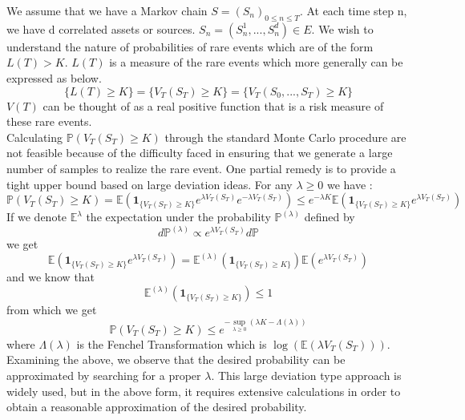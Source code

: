 We assume that we have a Markov chain $S=(S_n)_{0 \leq n \leq T}$. At each time step n, we have d correlated assets or sources. $S_n = (S_n^1,...,S_n^d) \in \mathit{E}$. We wish to understand the nature of probabilities of rare events which are of the form $L(T) > K$. $L(T)$ is a measure of the rare events which more generally can be expressed as below.
$$
\{L(T) \geq K\} = \{V_T(S_T)\geq K\} = \{V_T(S_0,...,S_T)\geq K\}
$$
$V(T)$ can be thought of as a real positive function that is a risk measure of these rare events.\\
Calculating $\mathbb{P}(V_T(S_T) \geq K)$ through the standard Monte Carlo procedure are not feasible because of the difficulty faced in ensuring that we generate a large number of samples to realize the rare event. One partial remedy is to provide a tight upper bound based on large deviation ideas. For any $\lambda \geq 0$ we have :
\begin{equation}
	\mathbb{P}(V_T(S_T)\geq K) = \mathbb{E}\left( \mathbf{1}_{\{V_T(S_T)\geq K\}} e^{\lambda V_T(S_T)} e^{-\lambda V_T(S_T)} \right) \leq
	e^{-\lambda K}\mathbb{E}\left( \mathbf{1}_{\{V_T(S_T)\geq K\}}e^{\lambda V_T(S_T)} \right)
\end{equation}
If we denote $\mathbb{E^{\lambda}}$ the expectation under the probability $\mathbb{P}^{(\lambda)}$ defined by
$$d\mathbb{P}^{(\lambda)} \propto e^{\lambda V_T(S_T)}d\mathbb{P}$$
we get 
$$\mathbb{E}\left( \mathbf{1}_{\{V_T(S_T)\geq K\}}e^{\lambda V_T(S_T)}  \right) = \mathbb{E}^{(\lambda)}\left(\mathbf{1}_{\{V_T(S_T)\geq K\}}\right)\mathbb{E}\left(e^{\lambda V_T(S_T)}\right)$$
and we know that
$$\mathbb{E}^{(\lambda)}\left(\mathbf{1}_{\{V_T(S_T)\geq K\}}\right)\leq 1 $$
from which we get
\begin{equation}
	\mathbb{P}\left(V_T(S_T) \geq K\right) \leq e^{-\sup_{\lambda\geq 0}(\lambda K - \Lambda(\lambda))}
\end{equation}
where $\Lambda(\lambda)$ is the Fenchel Transformation which is $\log (\mathbb{E}(\lambda V_T(S_T)))$.\\
Examining the above, we observe that the desired probability can be approximated by searching for a proper $\lambda$. This large deviation type approach is widely used, but in the above form, it requires extensive calculations in order to obtain a reasonable approximation of the desired probability.\\

